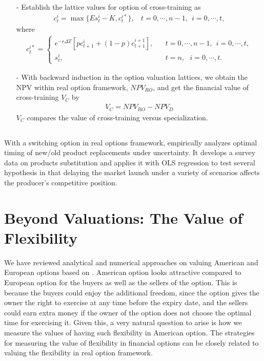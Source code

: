 \documentclass[11pt,letter]{article}
\def\D{\Delta} \def\G{\Gamma} \def\W{\Omega} \def\P{\Phi} \def\L{\Lambda} \def\Th{\Theta} \def\z{\zeta}
\theoremstyle{definition}
\theoremstyle{remark}
\numberwithin{equation}{section}
\begin{document}
\begin{itemize}
        \item[-] Establish the lattice values for option of cross-training as
        \begin{align*}
            c^i_t=\max\{Es^i_t-K,c^{i*}_t\},~~~~t=0,\cdots,n-1,~~i=0,\cdots,t,
        \end{align*}
        where 
        \begin{align*}
            c^{i*}_t=
            \begin{cases}
            e^{-r\D T}[pc^i_{t+1}+(1-p)c^{i+1}_{t+1}],~~~~&t=0,\cdots,n-1,~~i=0,\cdots,t,\\
            s^i_t,~~~~&t=n,~~~i=0,\cdots,t.
            \end{cases}
        \end{align*}
    
    \item[-] With backward induction in the option valuation lattices, we obtain the NPV within real option framework, $NPV_{RO}$, and get the financial value of cross-training $V_C$ by
        \begin{align*}
            V_C=NPV_{RO}-NPV_D
        \end{align*}
        $V_C$ compares the value of cross-training versus specialization.
\end{itemize}


\subsection{\cite{fisch2014timing}}
With a switching option in real options framework, \cite{fisch2014timing} empirically analyzes optimal timing of new/old product replacements under uncertainty. It develops a survey data on products substitution and applies it with OLS regression to test several hypothesis in that delaying the market launch under a variety of scenarios affects the producer's competitive position.




\section{Beyond Valuations: The Value of Flexibility}

We have reviewed analytical and numerical approaches on valuing American and European options based on \cite{black1973pricing}. American option looks attractive compared to European option for the buyers as well as the sellers of the option. This is because the buyers could enjoy the additional freedom, since the option gives the owner the right to exercise at any time before the expiry date, and the sellers could earn extra money if the owner of the option does not choose the optimal time for exercising it. Given this, a very natural question to arise is how we measure the values of having such flexibility in American option. The strategies for measuring the value of flexibility in financial options can be closely related to valuing the flexibility in real option framework. 
\end{document}
